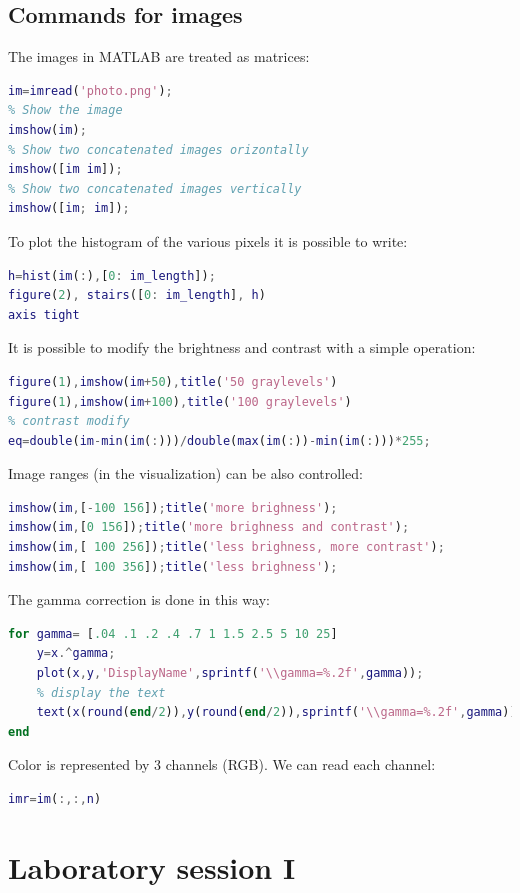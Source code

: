 \documentclass[12pt, a4paper]{report}
\begin{document}
    \section{Commands for images}
    The images in MATLAB are treated as matrices:
    \begin{lstlisting}[language=Matlab]
im=imread('photo.png');
% Show the image
imshow(im);
% Show two concatenated images orizontally
imshow([im im]);
% Show two concatenated images vertically
imshow([im; im]);
    \end{lstlisting}
    To plot the histogram of the various pixels it is possible to write: 
    \begin{lstlisting}[language=Matlab]
h=hist(im(:),[0: im_length]);
figure(2), stairs([0: im_length], h)
axis tight
    \end{lstlisting}
    It is possible to modify the brightness and contrast with a simple operation:
    \begin{lstlisting}[language=Matlab]
figure(1),imshow(im+50),title('50 graylevels')
figure(1),imshow(im+100),title('100 graylevels')
% contrast modify
eq=double(im-min(im(:)))/double(max(im(:))-min(im(:)))*255;
    \end{lstlisting}
    Image ranges (in the visualization) can be also controlled:
    \begin{lstlisting}[language=Matlab]
imshow(im,[-100 156]);title('more brighness');
imshow(im,[0 156]);title('more brighness and contrast');
imshow(im,[ 100 256]);title('less brighness, more contrast');
imshow(im,[ 100 356]);title('less brighness');
    \end{lstlisting}
    The gamma correction is done in this way: 
    \begin{lstlisting}[language=Matlab]
for gamma= [.04 .1 .2 .4 .7 1 1.5 2.5 5 10 25]
    y=x.^gamma;
    plot(x,y,'DisplayName',sprintf('\\gamma=%.2f',gamma));
    % display the text
    text(x(round(end/2)),y(round(end/2)),sprintf('\\gamma=%.2f',gamma));
end
    \end{lstlisting}
    Color is represented by 3 channels (RGB). We can read each channel:
    \begin{lstlisting}[language=Matlab]
% n=1 for red, n=2 for green, and n=3 for blue
imr=im(:,:,n)
    \end{lstlisting}

    \newpage

\chapter{Laboratory session I}
\end{document}

